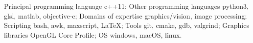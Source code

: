 
\begin{cvskills}
  \cvskill
    {Principal programming language}
    {c++11;}
  \cvskill
    {Other programming languages}
    {python3, glsl, matlab, objective-c;}
  \cvskill
    {Domains of expertise}
    {graphics/vision, image processing;}
  \cvskill
    {Scripting}
    {bash, awk, maxscript, LaTeX;}
  \cvskill
    {Tools}
    {git, cmake, gdb, valgrind;}
  \cvskill
    {Graphics libraries}
    {OpenGL Core Profile;}
  \cvskill
    {OS}
    {windows, macOS, linux.}
\end{cvskills}

%
